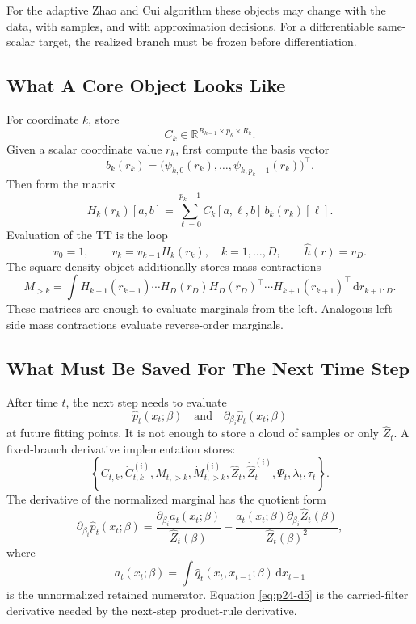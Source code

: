 \documentclass[11pt]{article}
\newcommand{\R}{\mathbb R}
\newcommand{\dd}{\,\mathrm d}
\begin{document}
For the adaptive Zhao and Cui \cite{zhao2024ttsequential} algorithm these objects may change with the data,
with samples, and with approximation decisions.  For a differentiable
same-scalar target, the realized branch must be frozen before differentiation.

\subsection{What A Core Object Looks Like}

For coordinate \(k\), store
\[
    C_k\in\R^{R_{k-1}\times p_k\times R_k}.
\]
Given a scalar coordinate value \(r_k\), first compute the basis vector
\[
    b_k(r_k)=
    \bigl(\psi_{k,0}(r_k),\ldots,\psi_{k,p_k-1}(r_k)\bigr)^\top.
\]
Then form the matrix
\[
    H_k(r_k)[a,b]
    =
    \sum_{\ell=0}^{p_k-1}C_k[a,\ell,b]\,b_k(r_k)[\ell].
    \label{eq:p24-d1}
\]
Evaluation of the TT is the loop
\[
    v_0=1,\qquad
    v_k=v_{k-1}H_k(r_k),\quad k=1,\ldots,D,
    \qquad
    \widehat h(r)=v_D.
    \label{eq:p24-d2}
\]
The square-density object additionally stores mass contractions
\[
    M_{>k}
    =
    \int H_{k+1}(r_{k+1})\cdots H_D(r_D)
    H_D(r_D)^\top\cdots H_{k+1}(r_{k+1})^\top
    \dd r_{k+1:D}.
    \label{eq:p24-d3}
\]
These matrices are enough to evaluate marginals from the left.  Analogous
left-side mass contractions evaluate reverse-order marginals.

\subsection{What Must Be Saved For The Next Time Step}

After time \(t\), the next step needs to evaluate
\[
    \widehat p_t(x_t;\beta)
    \quad\text{and}\quad
    \partial_{\beta_i}\widehat p_t(x_t;\beta)
\]
at future fitting points.  It is not enough to store a cloud of samples or only
\(\widehat Z_t\).  A fixed-branch derivative implementation stores:
\[
    \left\{
    C_{t,k},\dot C_{t,k}^{(i)},M_{t,>k},\dot M_{t,>k}^{(i)},
    \widehat Z_t,\dot{\widehat Z}_t^{(i)},
    \Psi_t,\lambda_t,\tau_t
    \right\}.
    \label{eq:p24-d4}
\]
The derivative of the normalized marginal has the quotient form
\[
    \partial_{\beta_i}\widehat p_t(x_t;\beta)
    =
    \frac{\partial_{\beta_i}a_t(x_t;\beta)}{\widehat Z_t(\beta)}
    -
    \frac{a_t(x_t;\beta)\partial_{\beta_i}\widehat Z_t(\beta)}
    {\widehat Z_t(\beta)^2},
    \label{eq:p24-d5}
\]
where
\[
    a_t(x_t;\beta)
    =
    \int \widehat q_t(x_t,x_{t-1};\beta)\dd x_{t-1}
    \label{eq:p24-d6}
\]
is the unnormalized retained numerator.  Equation \eqref{eq:p24-d5} is the carried-filter
derivative needed by the next-step product-rule derivative.
\end{document}
